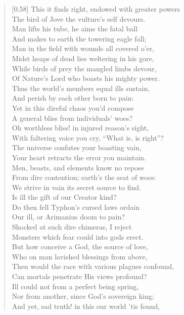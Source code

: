 \begin{verse}[0.58\textwidth]
This it finds right, endowed with greater powers\\
The bird of Jove the vulture's self devours.\\
Man lifts his tube, he aims the fatal ball\\
And makes to earth the towering eagle fall;\\
Man in the field with wounds all covered o'er,\\
Midst heaps of dead lies weltering in his gore,\\
While birds of prey the mangled limbs devour,\\
Of Nature's Lord who boasts his mighty power.\\
Thus the world's members equal ills sustain,\\
And perish by each other born to pain:\\
Yet in this direful chaos you'd compose\\
A general bliss from individuals' woes?\\
Oh worthless bliss! in injured reason's sight,\\
With faltering voice you cry, ``What is, is right''?\\
The universe confutes your boasting vain,\\
Your heart retracts the error you maintain.\\
Men, beasts, and elements know no repose\\
From dire contention; earth's the seat of woes:\\
We strive in vain its secret source to find.\\
Is ill the gift of our Creator kind?\\
Do then fell Typhon's cursed laws ordain\\
Our ill, or Arimanius doom to pain?\\
Shocked at such dire chimeras, I reject\\
Monsters which fear could into gods erect.\\
But how conceive a God, the source of love,\\
Who on man lavished blessings from above,\\
Then would the race with various plagues confound,\\
Can mortals penetrate His views profound?\\
Ill could not from a perfect being spring,\\
Nor from another, since God's sovereign king;\\
And yet, sad truth! in this our world 'tis found,\\

\end{verse}
